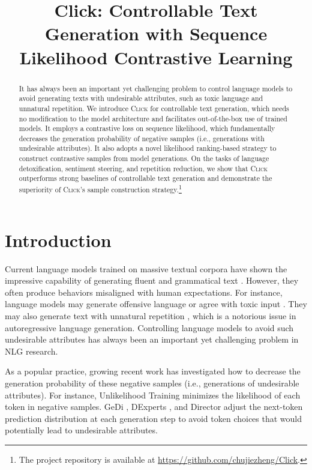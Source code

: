 \title{Click: Controllable Text Generation with Sequence Likelihood Contrastive Learning}

\begin{abstract}
It has always been an important yet challenging problem to control language models to avoid generating texts with undesirable attributes, such as toxic language and unnatural repetition. We introduce \textsc{Click} for controllable text generation, which needs no modification to the model architecture and facilitates out-of-the-box use of trained models. It employs a contrastive loss on sequence likelihood, which fundamentally decreases the generation probability of negative samples (i.e., generations with undesirable attributes). It also adopts a novel likelihood ranking-based strategy to construct contrastive samples from model generations. On the tasks of language detoxification, sentiment steering, and repetition reduction, we show that \textsc{Click} outperforms strong baselines of controllable text generation and demonstrate the superiority of \textsc{Click}'s sample construction strategy.\footnote{The project repository is available at \url{https://github.com/chujiezheng/Click}.}
\end{abstract}

\section{Introduction}

Current language models trained on massive textual corpora have shown the impressive capability of generating fluent and grammatical text \cite{gpt2, gpt3, blenderbot}. However, they often produce behaviors misaligned with human expectations. For instance, language models may generate offensive language or agree with toxic input \cite{bad, realtoxicityprompts, diasafety}. They may also generate text with unnatural repetition \cite{topp, simctg}, which is a notorious issue in autoregressive language generation. Controlling language models to avoid such undesirable attributes has always been an important yet challenging problem in NLG research.

As a popular practice, growing recent work has investigated how to decrease the generation probability of these negative samples (i.e., generations of undesirable attributes). For instance, Unlikelihood Training \cite{unlikelihood} minimizes the likelihood of each token in negative samples. GeDi \cite{gedi}, DExperts \cite{dexperts}, and Director \cite{director} adjust the next-token prediction distribution at each generation step to avoid token choices that would potentially lead to undesirable attributes.

